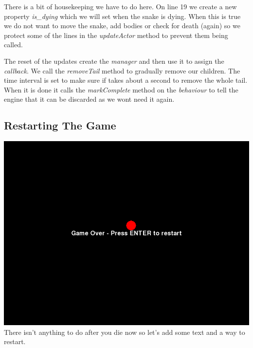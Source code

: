 \documentclass[letterpaper,10pt,english]{sphinxmanual}
\begin{document}
There is a bit of housekeeping we have to do here. On line 19 we create a new property \emph{is\_dying} which we will set
when the snake is dying. When this is true we do not want to move the snake, add bodies or check for death (again) so
we protect some of the lines in the \emph{updateActor} method to prevent them being called.

The reset of the updates create the \emph{manager} and then use it to assign the \emph{callback}. We call the \emph{removeTail}
method to gradually remove our children. The time interval is set to make sure if takes about a second
to remove the whole tail. When it is done it calls the \emph{markComplete}
method on the \emph{behaviour} to tell the engine that it can be discarded as we wont need it again.


\subsection{Restarting The Game}
\label{tutorial-1:restarting-the-game}\includegraphics{ss-1-restart.png}
There isn't anything to do after you die now so let's add some text and a way to restart.
\end{document}
